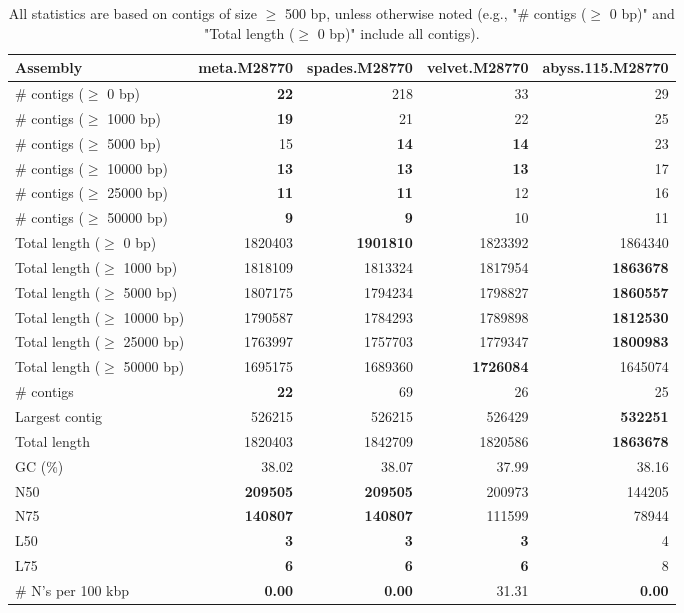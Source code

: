 \documentclass[12pt,a4paper]{article}
\begin{document}
\begin{table}[ht]
\begin{center}
\caption{All statistics are based on contigs of size $\geq$ 500 bp, unless otherwise noted (e.g., "\# contigs ($\geq$ 0 bp)" and "Total length ($\geq$ 0 bp)" include all contigs).}
\begin{tabular}{|l*{4}{|r}|}
\hline
Assembly & meta.M28770 & spades.M28770 & velvet.M28770 & abyss.115.M28770 \\ \hline
\# contigs ($\geq$ 0 bp) & {\bf 22} & 218 & 33 & 29 \\ \hline
\# contigs ($\geq$ 1000 bp) & {\bf 19} & 21 & 22 & 25 \\ \hline
\# contigs ($\geq$ 5000 bp) & 15 & {\bf 14} & {\bf 14} & 23 \\ \hline
\# contigs ($\geq$ 10000 bp) & {\bf 13} & {\bf 13} & {\bf 13} & 17 \\ \hline
\# contigs ($\geq$ 25000 bp) & {\bf 11} & {\bf 11} & 12 & 16 \\ \hline
\# contigs ($\geq$ 50000 bp) & {\bf 9} & {\bf 9} & 10 & 11 \\ \hline
Total length ($\geq$ 0 bp) & 1820403 & {\bf 1901810} & 1823392 & 1864340 \\ \hline
Total length ($\geq$ 1000 bp) & 1818109 & 1813324 & 1817954 & {\bf 1863678} \\ \hline
Total length ($\geq$ 5000 bp) & 1807175 & 1794234 & 1798827 & {\bf 1860557} \\ \hline
Total length ($\geq$ 10000 bp) & 1790587 & 1784293 & 1789898 & {\bf 1812530} \\ \hline
Total length ($\geq$ 25000 bp) & 1763997 & 1757703 & 1779347 & {\bf 1800983} \\ \hline
Total length ($\geq$ 50000 bp) & 1695175 & 1689360 & {\bf 1726084} & 1645074 \\ \hline
\# contigs & {\bf 22} & 69 & 26 & 25 \\ \hline
Largest contig & 526215 & 526215 & 526429 & {\bf 532251} \\ \hline
Total length & 1820403 & 1842709 & 1820586 & {\bf 1863678} \\ \hline
GC (\%) & 38.02 & 38.07 & 37.99 & 38.16 \\ \hline
N50 & {\bf 209505} & {\bf 209505} & 200973 & 144205 \\ \hline
N75 & {\bf 140807} & {\bf 140807} & 111599 & 78944 \\ \hline
L50 & {\bf 3} & {\bf 3} & {\bf 3} & 4 \\ \hline
L75 & {\bf 6} & {\bf 6} & {\bf 6} & 8 \\ \hline
\# N's per 100 kbp & {\bf 0.00} & {\bf 0.00} & 31.31 & {\bf 0.00} \\ \hline
\end{tabular}
\end{center}
\end{table}
\end{document}
